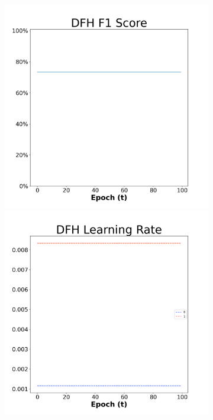 \begin{figure}[H]
    \centering %
\begin{subfigure}{0.3\textwidth}
  \includegraphics[width=\linewidth]{images/exper2/SP/DFH_0.01_f1.png}
    \includegraphics[width=\linewidth]{images/exper2/SP/DFH_0.01_lr.png}

\end{subfigure}
\end{figure}
